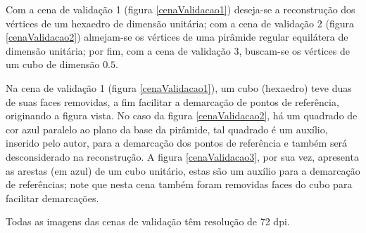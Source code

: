 	Com a cena de validação 1 (figura \ref{cenaValidacao1}) deseja-se a reconstrução dos vértices de um hexaedro de dimensão unitária; com a cena de validação 2 (figura \ref{cenaValidacao2}) almejam-se os vértices de uma pirâmide regular equilátera de dimensão unitária; por fim, com a cena de validação 3, buscam-se os vértices de um cubo de dimensão $0.5$. 
	
	Na cena de validação 1 (figura \ref{cenaValidacao1}), um cubo (hexaedro) teve duas de suas faces removidas, a fim facilitar a demarcação de pontos de referência, originando a figura vista. No caso da figura \ref{cenaValidacao2}, há um quadrado de cor azul paralelo ao plano da base da pirâmide, tal quadrado é um auxílio, inserido pelo autor, para a demarcação dos pontos de referência e também será desconsiderado na reconstrução. A figura \ref{cenaValidacao3}, por sua vez, apresenta as arestas (em azul) de um cubo unitário, estas são um auxílio para a demarcação de referências; note que nesta cena também foram removidas faces do cubo para facilitar demarcações.

	Todas as imagens das cenas de validação têm resolução de 72 dpi.